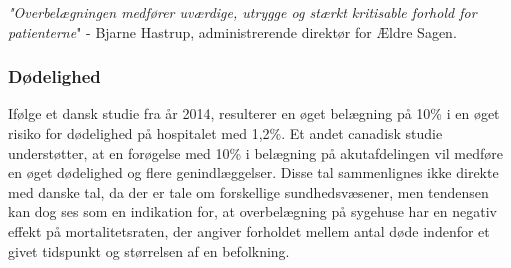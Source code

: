    \textit{"Overbelægningen medfører uværdige, utrygge og stærkt kritisable forhold for patienterne}" - Bjarne Hastrup, administrerende direktør for Ældre Sagen. \cite{Politiken2013} 



\subsubsection{Dødelighed}
Ifølge et dansk studie fra år 2014, resulterer en øget belægning på 10\% i en øget risiko for dødelighed på hospitalet med 1,2\%. \cite{Madsen2014}  Et andet canadisk studie understøtter, at en forøgelse med 10\% i belægning på akutafdelingen vil medføre en øget dødelighed og flere genindlæggelser.\cite{McCusker2014} Disse tal sammenlignes ikke direkte med danske tal, da der er tale om forskellige sundhedsvæsener, men tendensen kan dog ses som en indikation for, at overbelægning på sygehuse har en negativ effekt på mortalitetsraten, der angiver forholdet mellem antal døde indenfor et givet tidspunkt og størrelsen af en befolkning. \cite{denstoredanskeordbog2}  